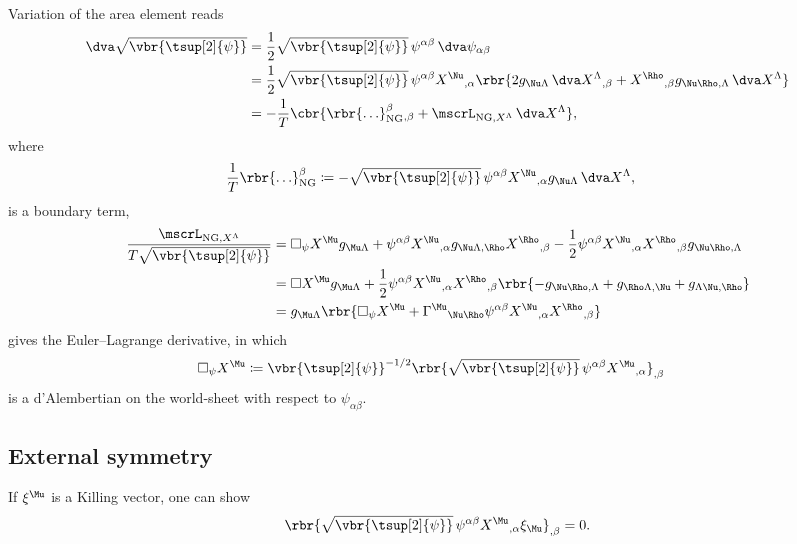 \documentclass[a4paper,11pt]{article}
\begin{document}
Variation of the area element reads
\begin{align}
\dva \sqrt{\vbr{\tsup[2]{\psi}}} &=
\frac{1}{2} \sqrt{\vbr{\tsup[2]{\psi}}}\, \psi^{\alpha\beta}\,
\dva \psi_{\alpha\beta}
\nonumber \\
&=
\frac{1}{2} \sqrt{\vbr{\tsup[2]{\psi}}}\, \psi^{\alpha\beta}
X^{\Nu}{}_{,\alpha}\rbr{2 g_{\Nu\Lambda}\, \dva X^{\Lambda}{}_{,\beta} + 
	X^{\Rho}{}_{,\beta} g_{\Nu\Rho,\Lambda}\, \dva X^{\Lambda}}
\nonumber \\
&=
-\frac{1}{T} \cbr{ \rbr{\ldots}_\text{NG}^{\beta}{}_{,\beta} +
	\mscrL_{\text{NG}, X^{\Lambda}}\,\dva X^\Lambda},
\end{align}
where
\begin{align}
\frac{1}{T} \rbr{\ldots}_\text{NG}^{\beta} &\coloneqq 
-\sqrt{\vbr{\tsup[2]{\psi}}}\, 
\psi^{\alpha\beta} X^{\Nu}{}_{,\alpha} g_{\Nu\Lambda}\,\dva X^{\Lambda},
\end{align}
is a boundary term,
\begin{align}
\frac{\mscrL_{\text{NG}, X^{\Lambda}}}{T\sqrt{\vbr{\tsup[2]{\psi}}}} &=
	\square_\psi X^{\Mu} g_{\Mu\Lambda} + 
	\psi^{\alpha\beta} X^{\Nu}{}_{,\alpha}
		g_{\Nu\Lambda,\Rho} X^{\Rho}{}_{,\beta} -
	\frac{1}{2} \psi^{\alpha\beta} X^{\Nu}{}_{,\alpha} X^{\Rho}{}_{,\beta}
		g_{\Nu\Rho,\Lambda}
\nonumber \\
&=
\square X^{\Mu} g_{\Mu\Lambda} + 
\frac{1}{2} \psi^{\alpha\beta} X^{\Nu}{}_{,\alpha} X^{\Rho}{}_{,\beta}
	\rbr{-g_{\Nu\Rho,\Lambda} + g_{\Rho\Lambda,\Nu} + g_{\Lambda\Nu,\Rho}}
\nonumber \\
&=
g_{\Mu\Lambda} \rbr{\square_\psi X^{\Mu} + \Gamma^{\Mu}{}_{\Nu\Rho} 
\psi^{\alpha\beta} X^{\Nu}{}_{,\alpha} X^{\Rho}{}_{,\beta}}
\end{align}
gives the Euler--Lagrange derivative, in which
\begin{align}
\square_\psi X^{\Mu} &\coloneqq
\vbr{\tsup[2]{\psi}}^{-1/2} \rbr{\sqrt{\vbr{\tsup[2]{\psi}}}\, 
	\psi^{\alpha\beta} X^{\Mu}{}_{,\alpha}}_{,\beta}
\end{align}
is a d'Alembertian on the world-sheet with respect to $\psi_{\alpha\beta}$.


\subsection{External symmetry}
\label{sec:bos-str-ext-sym}

If $\xi^\Mu$ is a Killing vector, one can show
\begin{align}
	\rbr{\sqrt{\vbr{\tsup[2]{\psi}}}\, \psi^{\alpha\beta}
		X^{\Mu}{}_{,\alpha} \xi_{\Mu}}_{,\beta} = 0.
\end{align}
\end{document}
